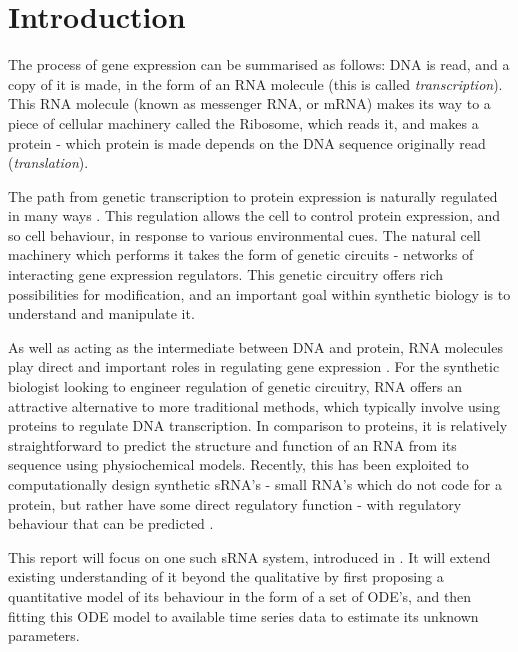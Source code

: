 \documentclass[10pt,journal]{./IEEE_latex_class/IEEEtran}
\begin{document}
\IEEEpeerreviewmaketitle




\section{Introduction}
\label{sec: Intro}
The process of gene expression can be summarised as follows: DNA is read, and a copy of it is made, in the form of an RNA molecule (this is called \textit{transcription}). This RNA molecule (known as messenger RNA, or mRNA) makes its way to a piece of cellular machinery called the Ribosome, which reads it, and makes a protein - which protein is made depends on the DNA sequence originally read (\textit{translation}).  

 The path from genetic transcription to protein expression is naturally regulated in many ways \cite{MolecularBiology}. This regulation allows the cell to control protein expression, and so cell behaviour, in response to various environmental cues. The natural cell machinery which performs it takes the form of genetic circuits - networks of interacting gene expression regulators. This genetic circuitry offers rich possibilities for modification, and an important goal within synthetic biology is to understand and manipulate it.

As well as acting as the intermediate between DNA and protein, RNA molecules play direct and important roles in regulating gene expression \cite{Isaacs2006}. For the synthetic biologist looking to engineer regulation of genetic circuitry, RNA offers an attractive alternative to more traditional methods, which typically involve using proteins to regulate DNA transcription. In comparison to proteins, it is relatively straightforward to predict the structure and function of an RNA from its sequence using physiochemical models. Recently, this has been exploited to computationally design synthetic sRNA's - small RNA's which do not code for a protein, but rather have some direct regulatory function -  with regulatory behaviour that can be predicted \cite{Rodrigo2013}\cite{Rodrigo2012}.

This report will focus on one such sRNA system, introduced in \cite{Rodrigo2012}. It will extend existing understanding of it beyond the qualitative by first proposing a quantitative model of its behaviour in the form of a set of ODE's, and then fitting this ODE model to available time series data to estimate its unknown parameters.
\end{document}
